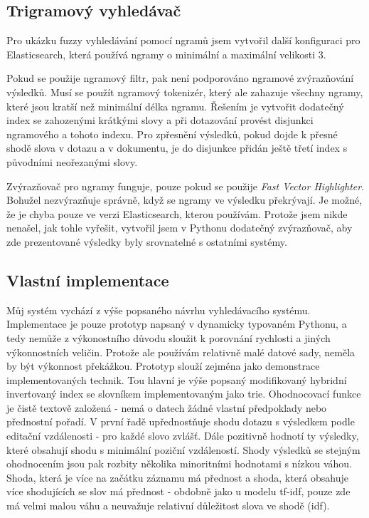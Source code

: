 \documentclass[12pt,letterpaper,oneside,openright]{book}
\begin{document}
\subsection{Trigramový vyhledávač}
Pro ukázku fuzzy vyhledávání pomocí ngramů jsem vytvořil další konfiguraci pro
Elasticsearch, která používá ngramy o minimální a maximální velikosti 3.

Pokud se použije ngramový filtr, pak není podporováno ngramové zvýrazňování
výsledků. Musí se použít ngramový tokenizér, který ale zahazuje všechny ngramy,
které jsou kratší než minimální délka ngramu. Řešením je vytvořit dodatečný
index se zahozenými krátkými slovy a při dotazování provést disjunkci
ngramového a tohoto indexu. Pro zpřesnění výsledků, pokud dojde k přesné shodě
slova v dotazu a v dokumentu, je do disjunkce přidán ještě třetí index s
původními neořezanými slovy.

Zvýrazňovač pro ngramy funguje, pouze pokud se použije \textit{Fast Vector
Highlighter}. Bohužel nezvýrazňuje správně, když se ngramy ve výsledku
překrývají. Je možné, že je chyba pouze ve verzi Elasticsearch, kterou
používám. Protože jsem nikde nenašel, jak tohle vyřešit, vytvořil jsem v
Pythonu dodatečný zvýrazňovač, aby zde prezentované výsledky byly srovnatelné s
ostatními systémy.

\subsection{Vlastní implementace}
Můj systém vychází z výše popsaného návrhu vyhledávacího systému. Implementace
je pouze prototyp napsaný v dynamicky typovaném Pythonu, a tedy nemůže z
výkonostního důvodu sloužit k porovnání rychlosti a jiných výkonnostních
veličin. Protože ale používám relativně malé datové sady, neměla by být
výkonnost překážkou. Prototyp slouží zejména jako demonstrace implementovaných
technik. Tou hlavní je výše popsaný modifikovaný hybridní invertovaný index se
slovníkem implementovaným jako trie.  Ohodnocovací funkce je čistě textově
založená - nemá o datech žádné vlastní předpoklady nebo přednostní pořadí. V
první řadě upřednostňuje shodu dotazu s výsledkem podle editační vzdálenosti -
pro každé slovo zvlášť. Dále pozitivně hodnotí ty výsledky, které obsahují
shodu s minimální poziční vzdáleností.  Shody výsledků se stejným ohodnocením
jsou pak rozbity několika minoritními hodnotami s nízkou váhou. Shoda, která je
více na začátku záznamu má přednost a shoda, která obsahuje více shodujících se
slov má přednost - obdobně jako u modelu tf-idf, pouze zde má velmi malou váhu
a neuvažuje relativní důležitost slova ve shodě (idf).
\end{document}

